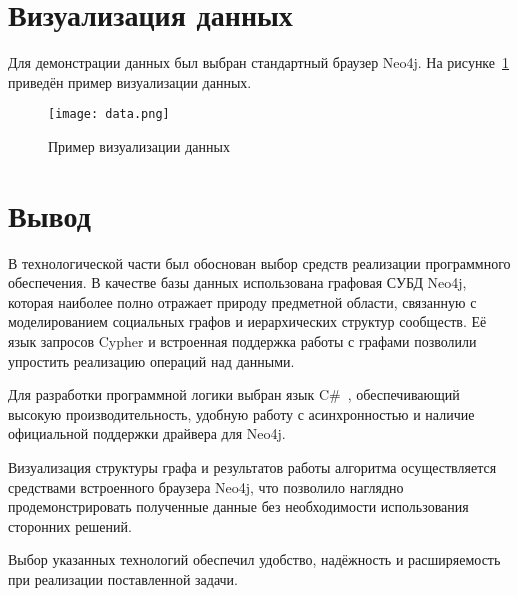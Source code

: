 \section{Визуализация данных}

Для демонстрации данных был выбран стандартный браузер Neo4j. На рисунке~\ref{fig:data} приведён пример визуализации данных.

\begin{figure}[H]
	\centering
	\texttt{[image: data.png]}
	\caption{Пример визуализации данных}
	\label{fig:data}
\end{figure}

\section*{Вывод}

В технологической части был обоснован выбор средств реализации программного обеспечения. В качестве базы данных использована графовая СУБД Neo4j, которая наиболее полно отражает природу предметной области, связанную с моделированием социальных графов и иерархических структур сообществ. Её язык запросов Cypher и встроенная поддержка работы с графами позволили упростить реализацию операций над данными.

Для разработки программной логики выбран язык C\#~\cite{Csharp}, обеспечивающий высокую производительность, удобную работу с асинхронностью и наличие официальной поддержки драйвера для Neo4j. 

Визуализация структуры графа и результатов работы алгоритма осуществляется средствами встроенного браузера Neo4j, что позволило наглядно продемонстрировать полученные данные без необходимости использования сторонних решений.

Выбор указанных технологий обеспечил удобство, надёжность и расширяемость при реализации поставленной задачи.

